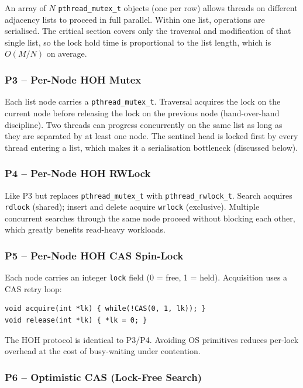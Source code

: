 \documentclass{article}
\begin{document}
An array of $N$ \texttt{pthread\_mutex\_t} objects (one per row) allows
threads on different adjacency lists to proceed in full parallel.
Within one list, operations are serialised. The critical section covers
only the traversal and modification of that single list, so the lock hold
time is proportional to the list length, which is $O(M/N)$ on average.

\subsubsection{P3 -- Per-Node HOH Mutex}

Each list node carries a \texttt{pthread\_mutex\_t}. Traversal acquires
the lock on the current node before releasing the lock on the previous
node (hand-over-hand discipline). Two threads can progress concurrently
on the same list as long as they are separated by at least one node.
The sentinel head is locked first by every thread entering a list,
which makes it a serialisation bottleneck (discussed below).

\subsubsection{P4 -- Per-Node HOH RWLock}

Like P3 but replaces \texttt{pthread\_mutex\_t} with
\texttt{pthread\_rwlock\_t}. Search acquires \texttt{rdlock} (shared);
insert and delete acquire \texttt{wrlock} (exclusive). Multiple
concurrent searches through the same node proceed without blocking each
other, which greatly benefits read-heavy workloads.

\subsubsection{P5 -- Per-Node HOH CAS Spin-Lock}

Each node carries an integer \texttt{lock} field (0 = free, 1 = held).
Acquisition uses a CAS retry loop:

\begin{verbatim}
void acquire(int *lk) { while(!CAS(0, 1, lk)); }
void release(int *lk) { *lk = 0; }
\end{verbatim}

The HOH protocol is identical to P3/P4. Avoiding OS primitives reduces
per-lock overhead at the cost of busy-waiting under contention.

\subsubsection{P6 -- Optimistic CAS (Lock-Free Search)}
\end{document}
